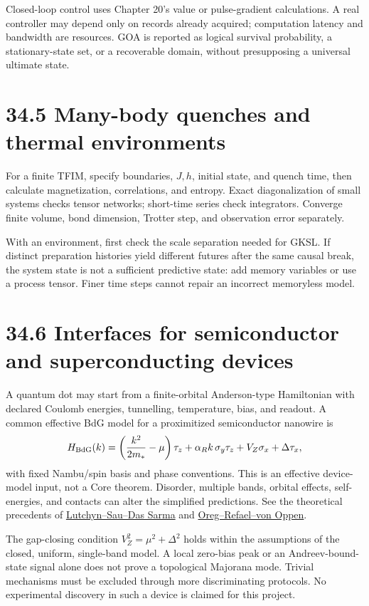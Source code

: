 \documentclass[
  11pt,
  oneside]{book}
\begin{document}
Closed-loop control uses Chapter 20's value or pulse-gradient
calculations. A real controller may depend only on records already
acquired; computation latency and bandwidth are resources. GOA is
reported as logical survival probability, a stationary-state set, or a
recoverable domain, without presupposing a universal ultimate state.

\section{34.5 Many-body quenches and thermal environments}

For a finite TFIM, specify boundaries, \(J,h\), initial state, and
quench time, then calculate magnetization, correlations, and entropy.
Exact diagonalization of small systems checks tensor networks;
short-time series check integrators. Converge finite volume, bond
dimension, Trotter step, and observation error separately.

With an environment, first check the scale separation needed for GKSL.
If distinct preparation histories yield different futures after the same
causal break, the system state is not a sufficient predictive state: add
memory variables or use a process tensor. Finer time steps cannot repair
an incorrect memoryless model.

\section{34.6 Interfaces for semiconductor and superconducting devices}

A quantum dot may start from a finite-orbital Anderson-type Hamiltonian
with declared Coulomb energies, tunnelling, temperature, bias, and
readout. A common effective BdG model for a proximitized semiconductor
nanowire is \[
H_{\rm BdG}(k)=
\left(\frac{k^2}{2m_*}-\mu\right)\tau_z
+\alpha_R k\,\sigma_y\tau_z+V_Z\sigma_x+\Delta\tau_x,
\] with fixed Nambu/spin basis and phase conventions. This is an
effective device-model input, not a Core theorem. Disorder, multiple
bands, orbital effects, self-energies, and contacts can alter the
simplified predictions. See the theoretical precedents of
\href{https://arxiv.org/abs/1002.4033}{Lutchyn--Sau--Das Sarma} and
\href{https://arxiv.org/abs/1003.1145}{Oreg--Refael--von Oppen}.

The gap-closing condition \(V_Z^2=\mu^2+\Delta^2\) holds within the
assumptions of the closed, uniform, single-band model. A local zero-bias
peak or an Andreev-bound-state signal alone does not prove a topological
Majorana mode. Trivial mechanisms must be excluded through more
discriminating protocols. No experimental discovery in such a device is
claimed for this project.
\end{document}
